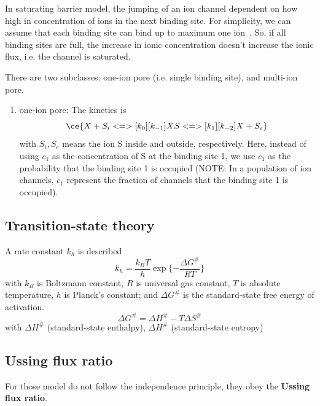 In saturating barrier model, the jumping of an ion channel dependent
on how high in concentration of ions in the next binding site. For
simplicity, we can assume that each binding site can bind up to
maximum one ion~\citep{lauger1973, hille1992mb}. So, if all binding sites
are full, the increase in ionic concentration doesn't increase the
ionic flux, i.e. the channel is saturated.

There are two subclasses: one-ion pore (i.e. single binding site), and
multi-ion pore.

\begin{enumerate}
\item one-ion pore: The kinetics is
  \begin{equation}
    \label{eq:1399}
    \ce{X + S_i <=>[k_0][k_{-1}] XS <=>[k_1][k_{-2}] X + S_e}
  \end{equation}
  with $S_i, S_e$ means the ion S inside and outside, respectively.
  Here, instead of using $c_1$ as the concentration of S at the binding
  site 1, we use $c_1$ as the probability that the binding site 1 is
  occupied (NOTE: In a population of ion channels, $c_1$ represent the
  fraction of channels that the binding site 1 is occupied).
\end{enumerate}

\subsection{Transition-state theory}
\label{sec:trans-state-theory}

A rate constant $k_h$ is described
\begin{equation}
  \label{eq:1206}
  k_h= \frac{k_BT}{h} \exp\{ -\frac{\Delta G^\#}{RT}\}
\end{equation}
with $k_B$ is Boltzmann constant, $R$ is universal gas constant, $T$
is absolute temperature, $h$ is Planck's constant; and $\Delta G^\#$ is
the standard-state free energy of activation.
\begin{equation}
  \label{eq:1207}
  \Delta G^\#=\Delta H^\# - T\Delta S^\#
\end{equation}
with $\Delta H^\#$ (standard-state enthalpy), $\Delta H^\#$
(standard-state entropy)

\subsection{Ussing flux ratio}
\label{sec:ussing-flux-ratio}

For those model do not follow the independence principle, they obey
the {\bf Ussing flux ratio}.

